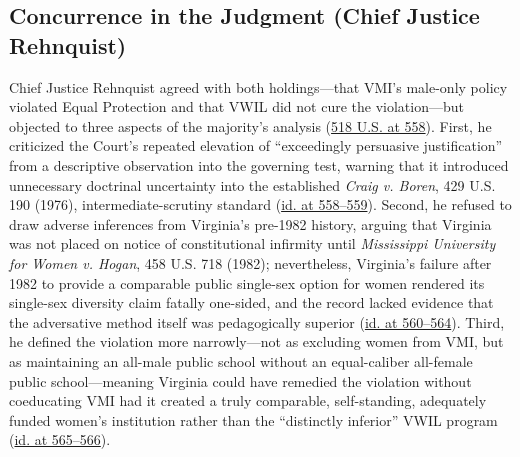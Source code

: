 \documentclass[12pt]{article}
\begin{document}
\subsection{Concurrence in the Judgment (Chief Justice Rehnquist)}
Chief Justice Rehnquist agreed with both holdings---that VMI's male-only policy violated Equal Protection and that VWIL did not cure the violation---but objected to three aspects of the majority's analysis (\href{https://supreme.justia.com/cases/federal/us/518/515/}{518 U.S. at 558}). First, he criticized the Court's repeated elevation of ``exceedingly persuasive justification'' from a descriptive observation into the governing test, warning that it introduced unnecessary doctrinal uncertainty into the established \textit{Craig v. Boren}, 429 U.S. 190 (1976), intermediate-scrutiny standard (\href{https://supreme.justia.com/cases/federal/us/518/515/}{id. at 558--559}). Second, he refused to draw adverse inferences from Virginia's pre-1982 history, arguing that Virginia was not placed on notice of constitutional infirmity until \textit{Mississippi University for Women v. Hogan}, 458 U.S. 718 (1982); nevertheless, Virginia's failure after 1982 to provide a comparable public single-sex option for women rendered its single-sex diversity claim fatally one-sided, and the record lacked evidence that the adversative method itself was pedagogically superior (\href{https://supreme.justia.com/cases/federal/us/518/515/}{id. at 560--564}). Third, he defined the violation more narrowly---not as excluding women from VMI, but as maintaining an all-male public school without an equal-caliber all-female public school---meaning Virginia could have remedied the violation without coeducating VMI had it created a truly comparable, self-standing, adequately funded women's institution rather than the ``distinctly inferior'' VWIL program (\href{https://supreme.justia.com/cases/federal/us/518/515/}{id. at 565--566}).
\end{document}

